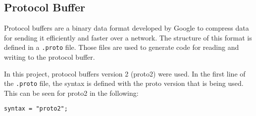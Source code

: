 \documentclass[../MasterThesis.tex]{subfiles}
\begin{document}
\subsection{Protocol Buffer}
\label{subsection:protocolbuffer}


Protocol buffers are a binary data format developed by Google to compress data for sending it efficiently and faster over a network. The structure of this format is defined in a \texttt{.proto} file. Those files are used to generate code for reading and writing to the protocol buffer.~\cite{protobuffer}

In this project, protocol buffers version 2 (proto2) were used. In the first line of the \texttt{.proto} file, the syntax is defined with the proto version that is being used. This can be seen for proto2 in the following:

\begin{lstlisting}[style=protobufStyle, numbers=none]
	syntax = "proto2";
\end{lstlisting}
\end{document}
